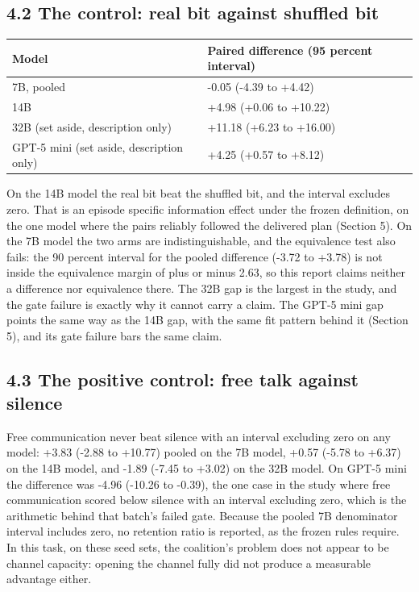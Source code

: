 \documentclass[11pt]{article}
\begin{document}
\subsection{4.2 The control: real bit against shuffled
bit}\label{the-control-real-bit-against-shuffled-bit}

{\def\LTcaptype{none} %
\begin{longtable}[]{@{}ll@{}}
\toprule\noalign{}
Model & Paired difference (95 percent interval) \\
\midrule\noalign{}
\endhead
\bottomrule\noalign{}
\endlastfoot
7B, pooled & -0.05 (-4.39 to +4.42) \\
14B & +4.98 (+0.06 to +10.22) \\
32B (set aside, description only) & +11.18 (+6.23 to +16.00) \\
GPT-5 mini (set aside, description only) & +4.25 (+0.57 to +8.12) \\
\end{longtable}
}

On the 14B model the real bit beat the shuffled bit, and the interval
excludes zero. That is an episode specific information effect under the
frozen definition, on the one model where the pairs reliably followed
the delivered plan (Section 5). On the 7B model the two arms are
indistinguishable, and the equivalence test also fails: the 90 percent
interval for the pooled difference (-3.72 to +3.78) is not inside the
equivalence margin of plus or minus 2.63, so this report claims neither
a difference nor equivalence there. The 32B gap is the largest in the
study, and the gate failure is exactly why it cannot carry a claim. The
GPT-5 mini gap points the same way as the 14B gap, with the same fit
pattern behind it (Section 5), and its gate failure bars the same claim.

\subsection{4.3 The positive control: free talk against
silence}\label{the-positive-control-free-talk-against-silence}

Free communication never beat silence with an interval excluding zero on
any model: +3.83 (-2.88 to +10.77) pooled on the 7B model, +0.57 (-5.78
to +6.37) on the 14B model, and -1.89 (-7.45 to +3.02) on the 32B model.
On GPT-5 mini the difference was -4.96 (-10.26 to -0.39), the one case
in the study where free communication scored below silence with an
interval excluding zero, which is the arithmetic behind that batch's
failed gate. Because the pooled 7B denominator interval includes zero,
no retention ratio is reported, as the frozen rules require. In this
task, on these seed sets, the coalition's problem does not appear to be
channel capacity: opening the channel fully did not produce a measurable
advantage either.
\end{document}
